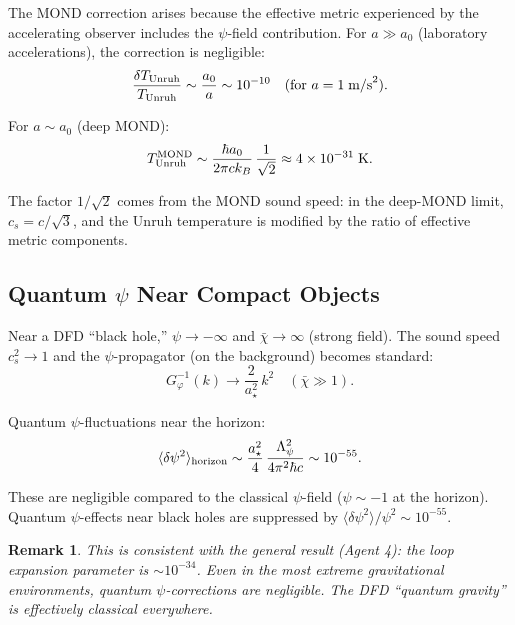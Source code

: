 \documentclass[11pt,a4paper]{article}
\newtheorem{remark}{Remark}
\begin{document}
The MOND correction arises because the effective metric experienced by the accelerating observer includes the $\psi$-field contribution. For $a \gg a_0$ (laboratory accelerations), the correction is negligible:
\begin{equation}
\frac{\delta T_{\rm Unruh}}{T_{\rm Unruh}} \sim \frac{a_0}{a} \sim 10^{-10}\quad(\text{for }a = 1\;\text{m/s}^2).
\end{equation}

For $a \sim a_0$ (deep MOND):
\begin{equation}
T_{\rm Unruh}^{\rm MOND} \sim \frac{\hbar a_0}{2\pi c k_B}\,\frac{1}{\sqrt{2}} \approx 4\times 10^{-31}\;\text{K}.
\end{equation}

The factor $1/\sqrt{2}$ comes from the MOND sound speed: in the deep-MOND limit, $c_s = c/\sqrt{3}$, and the Unruh temperature is modified by the ratio of effective metric components.

\subsection{Quantum $\psi$ Near Compact Objects}
\label{sec:compact-quantum}

Near a DFD ``black hole,'' $\psi \to -\infty$ and $\bar\chi \to \infty$ (strong field). The sound speed $c_s^2 \to 1$ and the $\psi$-propagator (on the background) becomes standard:
\begin{equation}
G_\varphi^{-1}(k) \to \frac{2}{a_\star^2}\,k^2\quad(\bar\chi \gg 1).
\end{equation}

Quantum $\psi$-fluctuations near the horizon:
\begin{equation}
\langle\delta\psi^2\rangle_{\rm horizon} \sim \frac{a_\star^2}{4}\,\frac{\Lambda_\psi^2}{4\pi^2\hbar c}
\sim 10^{-55}.
\end{equation}

These are negligible compared to the classical $\psi$-field ($\psi \sim -1$ at the horizon). Quantum $\psi$-effects near black holes are suppressed by $\langle\delta\psi^2\rangle/\psi^2 \sim 10^{-55}$.

\begin{remark}
This is consistent with the general result (Agent 4): the loop expansion parameter is $\sim 10^{-34}$. Even in the most extreme gravitational environments, quantum $\psi$-corrections are negligible. The DFD ``quantum gravity'' is effectively classical everywhere.
\end{remark}
\end{document}
